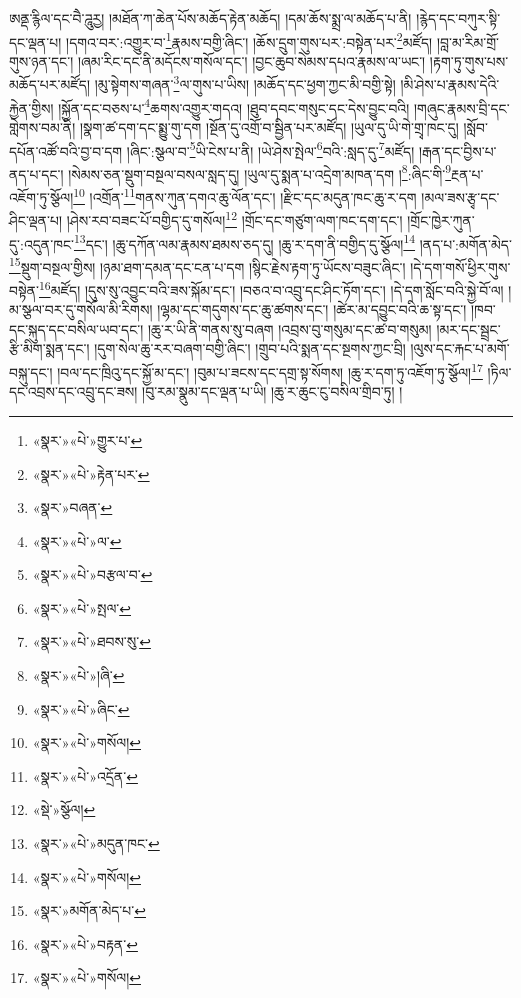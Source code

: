 ཨནྡ་རྙིལ་དང་བཻ་ཌཱུརྱ། །མཐོན་ཀ་ཆེན་པོས་མཆོད་རྟེན་མཆོད། །དམ་ཆོས་སྨྲ་ལ་མཆོད་པ་ནི། །རྙེད་དང་བཀུར་སྟི་དང་ལྡན་པ། །དགའ་བར་:འགྱུར་བ་\footnote{«སྣར་»«པེ་»གྱུར་པ་}རྣམས་བགྱི་ཞིང་། །ཆོས་དྲུག་གུས་པར་:བསྟེན་པར་\footnote{«སྣར་»«པེ་»རྟེན་པར་}མཛོད། །བླ་མ་རིམ་གྲོ་གུས་ཉན་དང་། །ཞམ་རིང་དང་ནི་མདོངས་གསོལ་དང་། །བྱང་ཆུབ་སེམས་དཔའ་རྣམས་ལ་ཡང་། །རྟག་ཏུ་གུས་པས་མཆོད་པར་མཛོད། །མུ་སྟེགས་གཞན་\footnote{«སྣར་»བཞན་}ལ་གུས་པ་ཡིས། །མཆོད་དང་ཕྱག་ཀྱང་མི་བགྱི་སྟེ། །མི་ཤེས་པ་རྣམས་དེའི་རྐྱེན་གྱིས། །སྐྱོན་དང་བཅས་པ་\footnote{«སྣར་»«པེ་»ལ་}ཆགས་འགྱུར་གདའ། །ཐུབ་དབང་གསུང་དང་དེས་བྱུང་བའི། །གཞུང་རྣམས་བྲི་དང་གླེགས་བམ་ནི། །སྣག་ཚ་དག་དང་སྨྱུ་གུ་དག །སྔོན་དུ་འགྲོ་བ་སྦྱིན་པར་མཛོད། །ཡུལ་དུ་ཡི་གེ་གྲྭ་ཁང་དུ། །སློབ་དཔོན་འཚོ་བའི་བྱ་བ་དག །ཞིང་:སྩལ་བ་\footnote{«སྣར་»«པེ་»བརྩལ་བ་}ཡི་ངེས་པ་ནི། །ཡེ་ཤེས་སྤེལ་\footnote{«སྣར་»«པེ་»སྤལ་}བའི་:སླད་དུ་\footnote{«སྣར་»«པེ་»ཐབས་སུ་}མཛོད། །རྒན་དང་བྱིས་པ་ནད་པ་དང་། །སེམས་ཅན་སྡུག་བསྔལ་བསལ་སླད་དུ། །ཡུལ་དུ་སྨན་པ་འདྲེག་མཁན་དག །\footnote{«སྣར་»«པེ་»།ཞི་}:ཞིང་གི་\footnote{«སྣར་»«པེ་»ཞིང་}རྔན་པ་འཇོག་ཏུ་སྩོལ།\footnote{«སྣར་»«པེ་»གསོལ།} །འགྲོན་\footnote{«སྣར་»«པེ་»འདྲོན་}གནས་ཀུན་དགའ་ཆུ་ལོན་དང་། །རྫིང་དང་མདུན་ཁང་ཆུ་ར་དག །མལ་ཟས་རྩྭ་དང་ཤིང་ལྡན་པ། །ཤེས་རབ་བཟང་པོ་བགྱིད་དུ་གསོལ།\footnote{«སྡེ་»སྩོལ།} །གྲོང་དང་གཙུག་ལག་ཁང་དག་དང་། །གྲོང་ཁྱེར་ཀུན་དུ་:འདུན་ཁང་\footnote{«སྣར་»«པེ་»མདུན་ཁང་}དང་། །ཆུ་དཀོན་ལམ་རྣམས་ཐམས་ཅད་དུ། །ཆུ་ར་དག་ནི་བགྱིད་དུ་སྩོལ།\footnote{«སྣར་»«པེ་»གསོལ།} །ནད་པ་:མགོན་མེད་\footnote{«སྣར་»མགོན་མེད་པ་}སྡུག་བསྔལ་གྱིས། །ཉམ་ཐག་དམན་དང་ངན་པ་དག །སྙིང་རྗེས་རྟག་ཏུ་ཡོངས་བཟུང་ཞིང་། །དེ་དག་གསོ་ཕྱིར་གུས་བསྟེན་\footnote{«སྣར་»«པེ་»བརྟན་}མཛོད། །དུས་སུ་འབྱུང་བའི་ཟས་སྐོམ་དང་། །བཅའ་བ་འབྲུ་དང་ཤིང་ཏོག་དང་། །དེ་དག་སློང་བའི་སྐྱེ་བོ་ལ། །མ་སྩལ་བར་དུ་གསོལ་མི་རིགས། །ལྷམ་དང་གདུགས་དང་ཆུ་ཚགས་དང་། །ཚེར་མ་དབྱུང་བའི་ཆ་སྟ་དང་། །ཁབ་དང་སྐུད་དང་བསིལ་ཡབ་དང་། །ཆུ་ར་ཡི་ནི་གནས་སུ་བཞག །འབྲས་བུ་གསུམ་དང་ཚ་བ་གསུམ། །མར་དང་སྦྲང་རྩི་མིག་སྨན་དང་། །དུག་སེལ་ཆུ་རར་བཞག་བགྱི་ཞིང་། །གྲུབ་པའི་སྨན་དང་སྔགས་ཀྱང་བྲི། །ལུས་དང་རྐང་པ་མགོ་བསྐུ་དང་། །བལ་དང་ཁྲིའུ་དང་སྐྱོ་མ་དང་། །བུམ་པ་ཟངས་དང་དགྲ་སྟ་སོགས། །ཆུ་ར་དག་ཏུ་འཇོག་ཏུ་སྩོལ།\footnote{«སྣར་»«པེ་»གསོལ།} །ཏིལ་དང་འབྲས་དང་འབྲུ་དང་ཟས། །བུ་རམ་སྣུམ་དང་ལྡན་པ་ཡི། །ཆུ་ར་ཆུང་ངུ་བསིལ་གྲིབ་ཏུ། །
